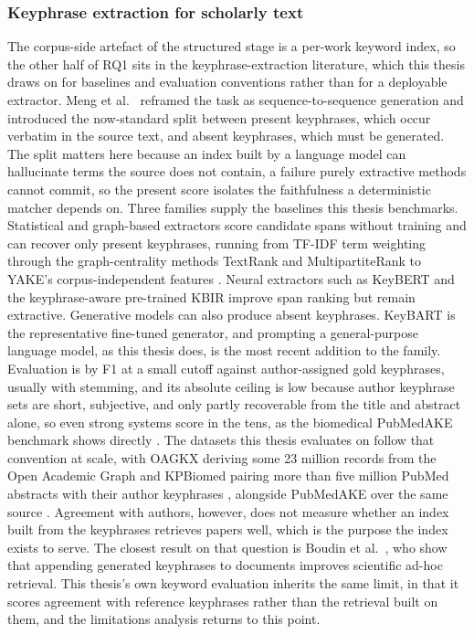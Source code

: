 \subsubsection{Keyphrase extraction for scholarly text}
\label{sec:lr-keyphrase}

The corpus-side artefact of the structured stage is a per-work keyword
index, so the other half of RQ1 sits in the keyphrase-extraction
literature, which this thesis draws on for baselines and evaluation
conventions rather than for a deployable extractor.  Meng et al.\
\cite{meng2017deepkp} reframed the task as sequence-to-sequence
generation and introduced the now-standard split between present
keyphrases, which occur verbatim in the source text, and absent
keyphrases, which must be generated.  The split matters here because an
index built by a language model can hallucinate terms the source does
not contain, a failure purely extractive methods cannot commit, so the
present score isolates the faithfulness a deterministic matcher depends
on.  Three families supply the baselines this thesis benchmarks.
Statistical and graph-based extractors score candidate spans without
training and can recover only present keyphrases, running from TF-IDF
term weighting \cite{salton1988termweighting} through the
graph-centrality methods TextRank \cite{mihalcea2004textrank} and
MultipartiteRank \cite{boudin2018multipartiterank} to YAKE's
corpus-independent features \cite{campos2020yake}.  Neural extractors
such as KeyBERT \cite{grootendorst2020keybert} and the keyphrase-aware
pre-trained KBIR \cite{kulkarni2022kbir} improve span ranking but
remain extractive.  Generative models can also produce absent
keyphrases.  KeyBART \cite{kulkarni2022kbir} is the representative
fine-tuned generator, and prompting a general-purpose language model,
as this thesis does, is the most recent addition to the family.  Evaluation is by F1 at a small cutoff
against author-assigned gold keyphrases, usually with stemming, and its
absolute ceiling is low because author keyphrase sets are short,
subjective, and only partly recoverable from the title and abstract
alone, so even strong systems score in the tens, as the biomedical
PubMedAKE benchmark shows directly \cite{sheng2022pubmedake}.  The
datasets this thesis evaluates on follow that convention at scale, with
OAGKX deriving some 23 million records from the Open Academic Graph
\cite{cano2020oagkx} and KPBiomed pairing more than five million PubMed
abstracts with their author keyphrases \cite{houbre2022kpbiomed},
alongside PubMedAKE over the same source \cite{sheng2022pubmedake}.
Agreement with authors, however, does not measure whether an index
built from the keyphrases retrieves papers well, which is the purpose
the index exists to serve.  The closest result on that question is
Boudin et al.\ \cite{boudin2020kpretrieval}, who show that appending
generated keyphrases to documents improves scientific ad-hoc
retrieval.  This thesis's own keyword evaluation inherits the same
limit, in that it scores agreement with reference keyphrases rather
than the retrieval built on them, and the limitations analysis returns
to this point.